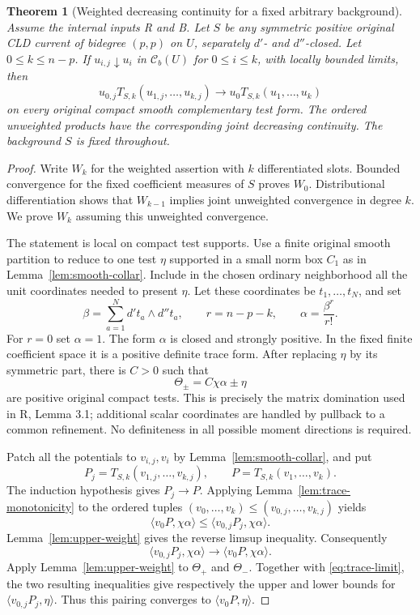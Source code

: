 \documentclass[11pt,a4paper]{article}
\numberwithin{equation}{section}
\newtheorem{theorem}{Theorem}[section]
\theoremstyle{definition}
\theoremstyle{remark}
\newcommand{\Cb}{\mathcal C_b}
\begin{document}
\begin{theorem}[Weighted decreasing continuity for a fixed arbitrary background]
\label{thm:relative-monotone}
Assume the internal inputs \textup{R} and \textup{B}. Let $S$ be any
symmetric positive original CLD current of bidegree $(p,p)$ on $U$,
separately $d'$- and $d''$-closed. Let $0\leq k\leq n-p$.
If $u_{i,j}\downarrow u_i$ in $\Cb(U)$ for $0\leq i\leq k$, with
locally bounded limits, then
\[
 u_{0,j}T_{S,k}(u_{1,j},\ldots,u_{k,j})
 \longrightarrow
 u_0T_{S,k}(u_1,\ldots,u_k)
\]
on every original compact smooth complementary test form. The ordered
unweighted products have the corresponding joint decreasing continuity.
The background $S$ is fixed throughout.
\end{theorem}

\begin{proof}
Write $W_k$ for the weighted assertion with $k$ differentiated slots.
Bounded convergence for the fixed coefficient measures of $S$ proves
$W_0$. Distributional differentiation shows that $W_{k-1}$ implies
joint unweighted convergence in degree $k$. We prove $W_k$ assuming
this unweighted convergence.

The statement is local on compact test supports. Use a finite original
smooth partition to reduce to one test $\eta$ supported in a small
norm box $C_1$ as in Lemma~\ref{lem:smooth-collar}. Include in the chosen
ordinary neighborhood all the unit coordinates needed to present
$\eta$. Let these coordinates be $t_1,\ldots,t_N$, and set
\[
 \beta=\sum_{a=1}^N d't_a\wedge d''t_a,
 \qquad r=n-p-k,\qquad \alpha=\frac{\beta^r}{r!}.
\]
For $r=0$ set $\alpha=1$. The form $\alpha$ is closed and strongly
positive. In the fixed finite coefficient space it is a positive
definite trace form. After replacing $\eta$ by its symmetric part,
there is $C>0$ such that
\[
 \Theta_\pm=C\chi\alpha\pm\eta
\]
are positive original compact tests. This is precisely the matrix
domination used in \textup{R}, Lemma 3.1; additional scalar coordinates
are handled by pullback to a common refinement. No definiteness in
all possible moment directions is required.

Patch all the potentials to $v_{i,j},v_i$ by
Lemma~\ref{lem:smooth-collar}, and put
\[
 P_j=T_{S,k}(v_{1,j},\ldots,v_{k,j}),\qquad
 P=T_{S,k}(v_1,\ldots,v_k).
\]
The induction hypothesis gives $P_j\to P$. Applying
Lemma~\ref{lem:trace-monotonicity} to the ordered tuples
$(v_0,\ldots,v_k)\leq(v_{0,j},\ldots,v_{k,j})$ yields
\[
 \langle v_0P,\chi\alpha\rangle
       \leq\langle v_{0,j}P_j,\chi\alpha\rangle.
\]
Lemma~\ref{lem:upper-weight} gives the reverse limsup inequality.
Consequently
\begin{equation}
 \label{eq:trace-limit}
 \langle v_{0,j}P_j,\chi\alpha\rangle
       \longrightarrow\langle v_0P,\chi\alpha\rangle.
\end{equation}
Apply Lemma~\ref{lem:upper-weight} to $\Theta_+$ and $\Theta_-$.
Together with \eqref{eq:trace-limit}, the two resulting inequalities
give respectively the upper and lower bounds for
$\langle v_{0,j}P_j,\eta\rangle$. Thus this pairing converges to
$\langle v_0P,\eta\rangle$.


\end{proof}
\end{document}

